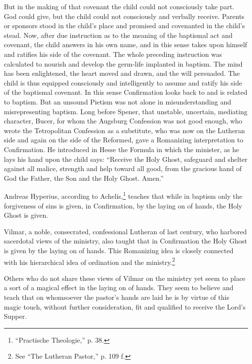 But in the making of that covenant the child could not consciously take part. God could give, but the child could not consciously and verbally receive. Parents or sponsors stood in the child’s place and promised and covenanted in the child’s stead. Now, after due instruction  as to the meaning of the baptismal act and covenant, the child answers in his own name, and in this sense takes upon himself and ratifies his side of the covenant. The whole preceding instruction was calculated to nourish and develop the germ-life implanted in baptism. The mind has been enlightened, the heart moved and drawn, and the will persuaded. The child is thus equipped consciously and intelligently to assume and ratify his side of the baptismal covenant. In this sense Confirmation looks back to and is related to baptism.
But an unsound Pietism was not alone in misunderstanding and misrepresenting baptism. Long before Spener, that unstable, uncertain, mediating character, Bucer, for whom the Augsburg Confession was not good enough, who wrote the Tetropolitan Confession as a substitute,  who was now on the Lutheran side and again on the side of the Reformed, gave a Romanizing interpretation to Confirmation. He introduced in Hesse the Formula in which the minister, as he lays his hand upon the child says: “Receive the Holy Ghost, safeguard and shelter against all malice, strength and help toward all good, from the gracious hand of God the Father, the Son and the Holy Ghost. Amen.”


Andreas Hyperius, according to Achelis,\footnote{“Practische Theologie,” p. 38.} teaches that while in baptism  only the forgiveness of sins is given, in Confirmation, by the laying on of hands, the Holy Ghost is given.


Vilmar, a noble, consecrated, confessional Lutheran of last century, who harbored sacerdotal views of the ministry, also taught that in Confirmation  the Holy Ghost is given by the laying on of hands. This Romanizing idea is closely connected with his hierarchical idea of ordination and the ministry.\footnote{See “The Lutheran Pastor,” p. 109 f.}


Others who do not share these views of Vilmar on the ministry yet seem to place a sort of a magical
effect in the laying on of hands. They seem to believe and teach that on whomsoever the pastor’s hands are laid he is by virtue of this magic touch, without further consideration, fit and qualified to receive the Lord’s Supper.


